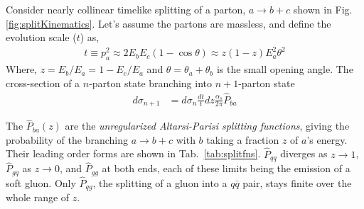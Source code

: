 Consider nearly collinear timelike splitting of a parton, \(a\to b+c\) shown in Fig. \ref{fig:splitKinematics}. Let's assume the partons are massless, and define the evolution scale (\(t\)) as, 
\begin{align}
	t \equiv p_a^2 \approx 2E_bE_c(1 - \cos\theta)  \approx z(1-z)E_a^2\theta^2
\end{align}
Where, \(z = E_b/E_a = 1 - E_c/E_a\) and \(\theta = \theta_a + \theta_b\) is the small opening angle.  The cross-section of a \(n\)-parton state branching into \(n+1\)-parton state~\cite{Ellis_Stirling_Webber_1996}
%
%
%
%
%
\begin{align}
	\label{eq:xsecBranching}
	d\sigma_{n+1} &= d\sigma_n \frac{dt}{t}dz\frac{\alpha_s}{2\pi} \hat{P}_{ba}
\end{align}

The \(\hat{P}_{ba}(z)\) are the \emph{unregularized Altarsi-Parisi splitting functions}, giving the probability of the branching \(a \to b + c\) with \(b\) taking a fraction \(z\) of \(a\)'s energy.
%
Their leading order forms are shown in Tab.~\ref{tab:splitfns}.
%
\(\hat{P}_{qq}\) diverges as \(z\to1\), \(\hat{P}_{gq}\) as \(z\to0\), and \(\hat{P}_{gg}\) at both ends, each of these limits being the emission of a soft gluon.
%
Only \(\hat{P}_{qg}\), the splitting of a gluon into a \(q\bar{q}\) pair, stays finite over the whole range of \(z\).
%

